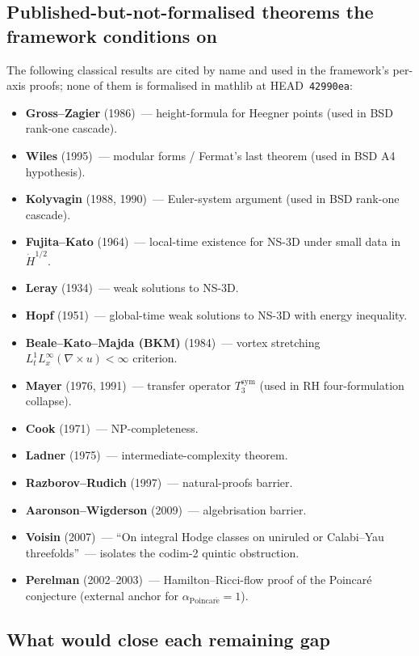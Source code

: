 \documentclass[11pt,a4paper]{article}
\theoremstyle{definition}
\theoremstyle{remark}
\newcommand{\alphaP}{\alpha_{\mathrm{Poincar\acute{e}}}}
\begin{document}
\subsection{Published-but-not-formalised theorems the framework conditions on}

The following classical results are cited by name and used in the
framework's per-axis proofs; none of them is formalised in
mathlib at HEAD~\texttt{42990ea}:

\begin{itemize}
\item \textbf{Gross--Zagier} (1986)~--- height-formula for Heegner
points (used in BSD rank-one cascade).
\item \textbf{Wiles} (1995)~--- modular forms / Fermat's last
theorem (used in BSD A4 hypothesis).
\item \textbf{Kolyvagin} (1988, 1990)~--- Euler-system argument
(used in BSD rank-one cascade).
\item \textbf{Fujita--Kato} (1964)~--- local-time existence for
NS-3D under small data in $\dot{H}^{1/2}$.
\item \textbf{Leray} (1934)~--- weak solutions to NS-3D.
\item \textbf{Hopf} (1951)~--- global-time weak solutions to NS-3D
with energy inequality.
\item \textbf{Beale--Kato--Majda (BKM)} (1984)~--- vortex
stretching $L^{1}_{t} L^{\infty}_{x}(\nabla \times u) < \infty$
criterion.
\item \textbf{Mayer} (1976, 1991)~--- transfer operator
$T_{3}^{\mathrm{sym}}$ (used in RH four-formulation collapse).
\item \textbf{Cook} (1971)~--- NP-completeness.
\item \textbf{Ladner} (1975)~--- intermediate-complexity theorem.
\item \textbf{Razborov--Rudich} (1997)~--- natural-proofs barrier.
\item \textbf{Aaronson--Wigderson} (2009)~--- algebrisation barrier.
\item \textbf{Voisin} (2007)~--- ``On integral Hodge classes on
uniruled or Calabi--Yau threefolds''~--- isolates the codim-2
quintic obstruction.
\item \textbf{Perelman} (2002--2003)~--- Hamilton--Ricci-flow
proof of the Poincar\'e conjecture (external anchor for
$\alphaP = 1$).
\end{itemize}

\subsection{What would close each remaining gap}
\end{document}
